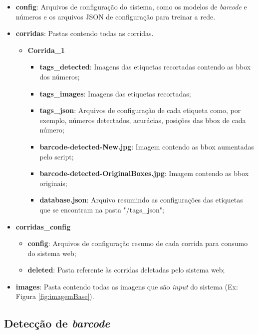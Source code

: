 \begin{itemize}
    \item \textbf{config}: Arquivos de configuração do sistema, como os modelos de \textit{barcode} e números e os arquivos JSON de configuração para treinar a rede.
    \item \textbf{corridas}: Pastas contendo todas as corridas.
    \begin{itemize}
        \item \textbf{Corrida\_1}
            \begin{itemize}
                \item \textbf{tags\_detected}: Imagens das etiquetas recortadas contendo as bbox dos números;
                \item \textbf{tags\_images}: Imagens das etiquetas recortadas;
                \item \textbf{tags\_json}: Arquivos  de configuração de cada etiqueta como, por exemplo, números detectados, acurácias, posições das bbox de cada número;
                \item \textbf{barcode-detected-New.jpg}: Imagem contendo as bbox aumentadas pelo script;
                \item \textbf{barcode-detected-OriginalBoxes.jpg}: Imagem contendo as bbox originais;
                \item \textbf{database.json}: Arquivo resumindo as configurações das etiquetas que se encontram na pasta "/tags\_json";
            \end{itemize}
    \end{itemize}
     \item \textbf{corridas\_config}
        \begin{itemize}
            \item \textbf{config}: Arquivos de configuração resumo de cada corrida para consumo do sistema web;
            \item \textbf{deleted}: Pasta referente às corridas deletadas pelo sistema web;
        \end{itemize}
    \item \textbf{images}: Pasta contendo todas as imagens que são \textit{input} do sistema (Ex: Figura \ref{fig:imagemBase}).
\end{itemize}



\subsection{Detecção de \textit{barcode}}

